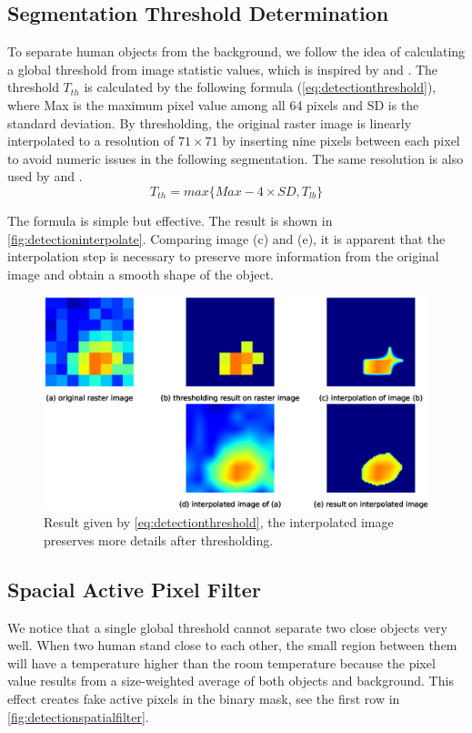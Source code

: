 \subsection{Segmentation Threshold Determination}
To separate human objects from the background, we follow the idea of calculating a global threshold from image statistic values, which is inspired by \cite{virtualtrack} and \cite{jeong2014probabilistic}. The threshold $T_{th}$ is calculated by the following formula (\autoref{eq:detectionthreshold}), where Max is the maximum pixel value among all 64 pixels and SD is the standard deviation. By thresholding, the original raster image is linearly interpolated to a resolution of $71\times71$ by inserting nine pixels between each pixel to avoid numeric issues in the following segmentation. The same resolution is also used by \cite{virtualtrack} and \cite{mika}.
\begin{equation}\label{eq:detectionthreshold}
  T_{th} = max\{Max - 4\times SD, T_{lb}\}
\end{equation}

The formula is simple but effective. The result is shown in \autoref{fig:detectioninterpolate}. Comparing image (c) and (e), it is apparent that the interpolation step is necessary to preserve more information from the original image and obtain a smooth shape of the object.
\begin{figure}
  \centering
  \includegraphics[width=\textwidth]{figures/detect_interpolate.eps}
  \caption{Result given by \autoref{eq:detectionthreshold}, the interpolated image preserves more details after thresholding.}\label{fig:detectioninterpolate}
\end{figure}

\subsection{Spacial Active Pixel Filter}
We notice that a single global threshold cannot separate two close objects very well. When two human stand close to each other, the small region between them will have a temperature higher than the room temperature because the pixel value results from a size-weighted average of both objects and background. This effect creates fake active pixels in the binary mask, see the first row in \autoref{fig:detectionspatialfilter}.

